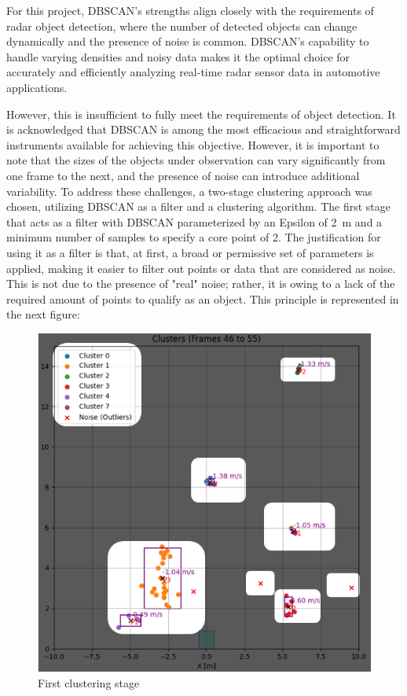 For this project, DBSCAN's strengths align closely with the requirements of radar object detection, where the number of detected objects can change dynamically and the presence of noise is common. DBSCAN's capability to handle varying densities and noisy data makes it the optimal choice for accurately and efficiently analyzing real-time radar sensor data in automotive applications.

However, this is insufficient to fully meet the requirements of object detection. It is acknowledged that DBSCAN is among the most efficacious and straightforward instruments available for achieving this objective. However, it is important to note that the sizes of the objects under observation can vary significantly from one frame to the next, and the presence of noise can introduce additional variability. To address these challenges, a two-stage clustering approach was chosen, utilizing DBSCAN as a filter and a clustering algorithm.
The first stage that acts as a filter with DBSCAN parameterized by an Epsilon of \SI{2}{\meter} and a minimum number of samples to specify a core point of 2.
The justification for using it as a filter is that, at first, a broad or permissive set of parameters is applied, making it easier to filter out points or data that are considered as noise. This is not due to the presence of "real" noise; rather, it is owing to a lack of the required amount of points to qualify as an object.
This principle is represented in the next figure:
\begin{figure}[!htbp]
    \centering
    \includegraphics[width=1.0\linewidth]{images/clustering.png}
    \caption{First clustering stage}
    \label{fig: First clustering stage}
\end{figure}
